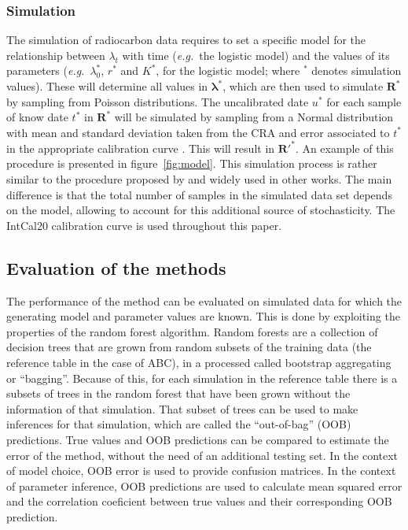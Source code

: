 \documentclass[a4paper]{article}
\begin{document}
\subsubsection*{Simulation}

The simulation of radiocarbon data requires to set a specific model for the relationship between $\lambda_t$ with time (\emph{e.g.}\ the logistic model) and the values of its parameters (\emph{e.g.}\ $\lambda_0^*$, $r^*$ and $K^*$, for the logistic model; where $^*$ denotes simulation values). These will determine all values in $\bm{\lambda}^*$, which are then used to simulate $\bm{R}^*$ by sampling from Poisson distributions. The uncalibrated date $u^*$ for each sample of know date $t^*$ in $\bm{R}^*$ will be simulated by sampling from a Normal distribution with mean and standard deviation taken from the CRA and error associated to $t^*$ in the appropriate calibration curve \parencite{Shennan2013}. This will result in $\bm{R}'^*$. An example of this procedure is presented in figure~\ref{fig:model}. This simulation process is rather similar to the procedure proposed by \textcite{Shennan2013} and widely used in other works. The main difference is that the total number of samples in the simulated data set depends on the model, allowing to account for this additional source of stochasticity. The IntCal20 calibration curve \parencite{Reimer2020} is used throughout this paper.
\\


\subsection*{Evaluation of the methods}

The performance of the method can be evaluated on simulated data for which the generating model and  parameter values are known. This is done by exploiting the properties of the random forest algorithm. Random forests are a collection of decision trees that are grown from random subsets of the training data (the reference table in the case of ABC), in a processed called bootstrap aggregating or ``bagging''. Because of this, for each simulation in the reference table there is a subsets of trees in the random forest that have been grown without the information of that simulation. That subset of trees can be used to make inferences for that simulation, which are called the ``out-of-bag'' (OOB) predictions. True values and OOB predictions can be compared to estimate the error of the method, without the need of an additional testing set. In the context of model choice, OOB error is used to provide confusion matrices. In the context of parameter inference, OOB predictions are used to calculate mean squared error and the correlation coeficient between true values and their corresponding OOB prediction.
\\
\end{document}

